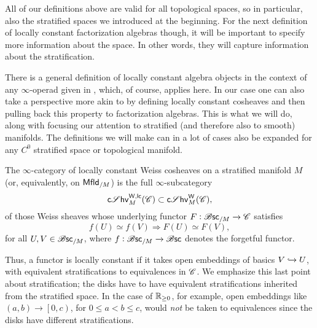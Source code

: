 \documentclass[../text]{subfiles}
\begin{document}
All of our definitions above are valid for all topological spaces, so in particular, also the stratified spaces we introduced at the beginning. For the next definition of locally constant factorization algebras though, it will be important to specify more information about the space. In other words, they will capture information about the stratification.

There is a general definition of locally constant algebra objects in the context of any $\infty$-operad given in \cite[def.2.3.3.20]{lurie_ha}, which, of course, applies here. In our case one can also take a perspective more akin to \cite[def.A.1.12]{lurie_ha} by defining locally constant cosheaves and then pulling back this property to factorization algebras. This is what we will do, along with focusing our attention to stratified (and therefore also to smooth) manifolds. The definitions we will make can in a lot of cases also be expanded for any $C^0$ stratified space or topological manifold.

\begin{definition}
    The $\infty$-category of locally constant Weiss cosheaves on a stratified manifold $M$ (or, equivalently, on $\mfld[r]_{/M}$) is the full $\infty$-subcategory
    \begin{equation}
        \csheaves[W, lc]_M (\catC) \subset \csheaves[W]_M (\catC),
    \end{equation}
    of those Weiss sheaves whose underlying functor $F: \mathscr{B} \mathsf{sc}_{/M} \xrightarrow{} \mathscr{C}$ satisfies
    \begin{equation}
        f(U) \simeq f(V) \Rightarrow F(U) \simeq F(V),
    \end{equation}
    for all $U, V \in \mathscr{B} \mathsf{sc}_{/M}$, where $f: \mathscr{B} \mathsf{sc}_{/M} \xrightarrow{} \mathscr{B} \mathsf{sc}$ denotes the forgetful functor.
\end{definition}

\begin{remark}
    Thus, a functor is locally constant if it takes open embeddings of basics $V \xhookrightarrow{} U$, with equivalent stratifications to equivalences in $\mathscr{C}$. We emphasize this last point about stratification; the disks have to have equivalent stratifications inherited from the stratified space. In the case of $\mathbb{R}_{\geq 0}$, for example, open embeddings like $(a, b) \rightarrow \left[0, c\right)$, for $0 \leq a < b \leq c$, would \emph{not} be taken to equivalences since the disks have different stratifications.
\end{remark}
\end{document}
